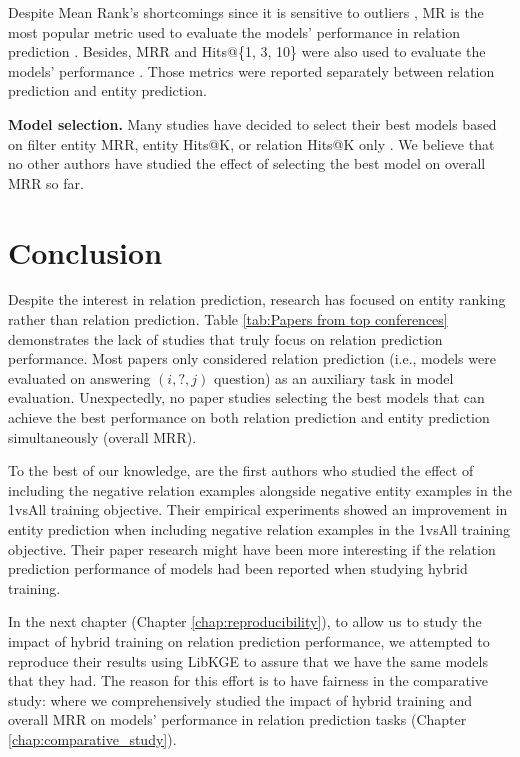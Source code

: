 Despite Mean Rank's shortcomings since it is sensitive to outliers \citep{nickel2016holographic}, MR is the most popular metric used to evaluate the models' performance in relation prediction \citep{cui2021type, Xie_Liu_Jia_Luan_Sun_2016, xie2016representation, lin2015modeling, shi2017proje, guan2018shared, yao2019kg}. Besides, MRR and Hits@\{1, 3, 10\} were also used to evaluate the models' performance \citep{chang2020benchmark, chen2021relation}. Those metrics were reported separately between relation prediction and entity prediction.
\newline

\noindent\textbf{Model selection.} Many studies have decided to select their best models based on filter entity MRR, entity Hits@K, \citep{Xie_Liu_Jia_Luan_Sun_2016, xie2016representation, lin2015modeling, shi2017proje, guan2018shared, yao2019kg}  or relation Hits@K only \citep{cui2021type}. We believe that no other authors have studied the effect of selecting the best model on overall MRR so far.  

\section{Conclusion}

Despite the interest in relation prediction, research has focused on entity ranking rather than relation prediction. Table \ref{tab:Papers from top conferences} demonstrates the lack of studies that truly focus on relation prediction performance. Most papers only considered relation prediction (i.e., models were evaluated on answering $(i,?,j)$ question) as an auxiliary task in model evaluation. Unexpectedly, no paper studies selecting the best models that can achieve the best performance on both relation prediction and entity prediction simultaneously (overall MRR). 

To the best of our knowledge, \citet{chen2021relation} are the first authors who studied the effect of including the negative relation examples alongside negative entity examples in the 1vsAll training objective. Their empirical experiments showed an improvement in entity prediction when including negative relation examples in the 1vsAll training objective. Their paper research might have been more interesting if the relation prediction performance of models had been reported when studying hybrid training.

In the next chapter (Chapter \ref{chap:reproducibility}), to allow us to study the impact of hybrid training on relation prediction performance, we attempted to reproduce their results using LibKGE \citep{libkge} to assure that we have the same models that they had. The reason for this effort is to have fairness in the comparative study: where we comprehensively studied the impact of hybrid training and overall MRR on models' performance in relation prediction tasks (Chapter \ref{chap:comparative_study}). 

